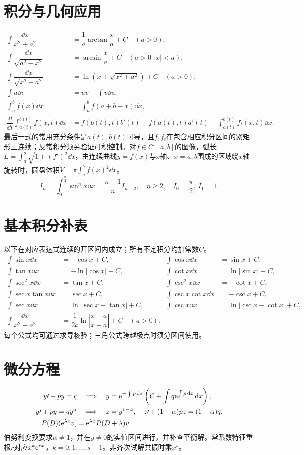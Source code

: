 \section{积分与几何应用}
\begin{align}
\int\dfrac{\dd x}{x^2+a^2}&=\dfrac1a\arctan\dfrac xa+C\quad(a>0),\\
\int\dfrac{\dd x}{\sqrt{a^2-x^2}}&=\arcsin\dfrac xa+C\quad(a>0,|x|<a),\\
\int\dfrac{\dd x}{\sqrt{x^2+a^2}}&=\ln\left(x+\sqrt{x^2+a^2}\right)+C\quad(a>0),\\
\int u\dd v&=uv-\int v\dd u,\\
\int_a^bf(x)\dd x&=\int_a^bf(a+b-x)\dd x,\\
\dfrac{\dd}{\dd t}\int_{a(t)}^{b(t)}f(x,t)\dd x
&=f(b(t),t)b\prime(t)-f(a(t),t)a\prime(t)+\int_{a(t)}^{b(t)}f_t(x,t)\dd x.
\end{align}
最后一式的常用充分条件是$a(t),b(t)$可导，且$f,f_t$在包含相应积分区间的紧矩形上连续；反常积分须另验证可积控制。对$f\in C^1[a,b]$的图像，弧长$L=\int_a^b\sqrt{1+(f\prime)^2}\dd x$。由连续曲线$y=f(x)$与$x$轴、$x=a,b$围成的区域绕$x$轴旋转时，圆盘体积$V=\pi\int_a^bf(x)^2\dd x$。
\begin{equation}
I_n=\int_0^{\frac{\pi}{2}}\sin^nx\dd x=\dfrac{n-1}{n}I_{n-2},\quad n\ge2,\quad I_0=\dfrac\pi2,\ I_1=1.
\end{equation}

\section{基本积分补表}
以下在对应表达式连续的开区间内成立；所有不定积分均加常数$C$。
\begin{align*}
\int\sin x\dd x&=-\cos x+C,&\int\cos x\dd x&=\sin x+C,\\
\int\tan x\dd x&=-\ln|\cos x|+C,&\int\cot x\dd x&=\ln|\sin x|+C,\\
\int\sec^2x\dd x&=\tan x+C,&\int\csc^2x\dd x&=-\cot x+C,\\
\int\sec x\tan x\dd x&=\sec x+C,&\int\csc x\cot x\dd x&=-\csc x+C,\\
\int\sec x\dd x&=\ln|\sec x+\tan x|+C,&\int\csc x\dd x&=\ln|\csc x-\cot x|+C,\\
\int\dfrac{\dd x}{x^2-a^2}&=\dfrac1{2a}\ln\left|\dfrac{x-a}{x+a}\right|+C\quad(a>0).
\end{align*}
每个公式均可通过求导核验；三角公式跨越极点时须分区间使用。
\section{微分方程}
\begin{align}
y\prime+py=q&\quad\Longrightarrow\quad y=\mathrm{e}^{-\int p\mathop{}\!\mathrm{d} x}\left(C+\int q\mathrm{e}^{\int p\mathop{}\!\mathrm{d} x}\mathop{}\!\mathrm{d} x\right),\\
y\prime+py=qy^\alpha&\quad\Longrightarrow\quad z=y^{1-\alpha},\quad z\prime+(1-\alpha)pz=(1-\alpha)q,\\
P(D)(\mathrm{e}^{\lambda x}v)&=\mathrm{e}^{\lambda x}P(D+\lambda)v.
\end{align}
伯努利变换要求$\alpha\ne1$，并在$y\ne0$的实值区间进行，并补查平衡解。常系数特征重根$r$对应$x^k\mathrm{e}^{rx}$，$k=0,1,\ldots,s-1$。非齐次试解共振时乘$x^s$。
